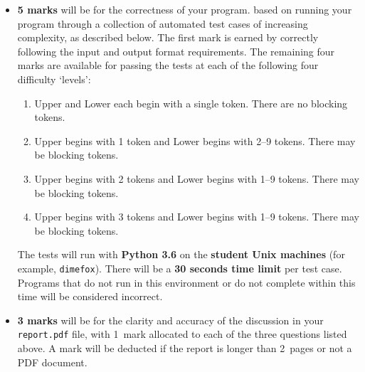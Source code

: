 \documentclass[]{article}
\begin{document}
\begin{itemize}
    \item
        \textbf{5 marks} will be for the correctness of your program.
        based on running your program through a collection of automated
        test cases of increasing complexity, as described below.
        The first mark is earned by correctly following the input and
        output format requirements.
        The remaining four marks are available for passing the tests at
        each of the following four difficulty `levels':\footnotemark
        \begin{enumerate}
            \item
                Upper and Lower each begin with a single token. There are no
                blocking tokens.
            \item
                Upper begins with 1 token and Lower begins with 2--9 tokens.
                There may be blocking tokens.
            \item
                Upper begins with 2 tokens and Lower begins with 1--9 tokens.
                There may be blocking tokens.
            \item
                Upper begins with 3 tokens and Lower begins with 1--9 tokens.
                There may be blocking tokens.
        \end{enumerate}
        The tests will run with \textbf{Python 3.6} on the \textbf{student
        Unix machines} (for example, \texttt{dimefox}\footnotemark).
        There will be a \textbf{30 seconds time limit} per test case.
        Programs that do not run in this environment or do not complete
        within this time will be considered incorrect.
    \item
        \textbf{3 marks} will be for the clarity and accuracy of the
        discussion in your \texttt{report.pdf} file, with 1~mark allocated
        to each of the three questions listed above.
        A mark will be deducted if the report is longer than 2~pages or not a
        PDF document.
\end{itemize}
\end{document}
